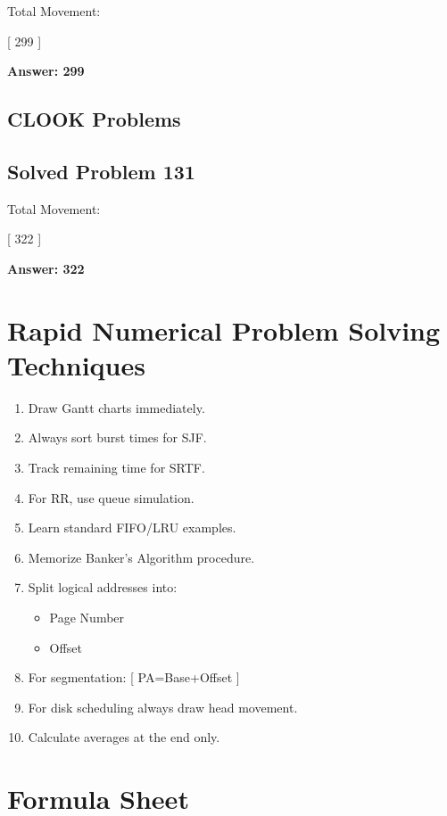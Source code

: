 Total Movement:

[
299
]

\textbf{Answer: 299}

\subsection{CLOOK Problems}

\subsection{Solved Problem 131}

Total Movement:

[
322
]

\textbf{Answer: 322}

\section{Rapid Numerical Problem Solving Techniques}

\begin{enumerate}
\item Draw Gantt charts immediately.
\item Always sort burst times for SJF.
\item Track remaining time for SRTF.
\item For RR, use queue simulation.
\item Learn standard FIFO/LRU examples.
\item Memorize Banker's Algorithm procedure.
\item Split logical addresses into:
\begin{itemize}
\item Page Number
\item Offset
\end{itemize}
\item For segmentation:
[
PA=Base+Offset
]
\item For disk scheduling always draw head movement.
\item Calculate averages at the end only.
\end{enumerate}

\section{Formula Sheet}

